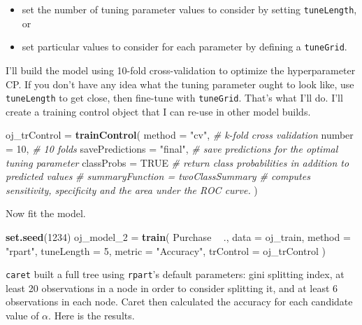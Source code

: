 \documentclass[]{book}
\newenvironment{Shaded}{\begin{snugshade}}{\end{snugshade}}
\newcommand{\CommentTok}[1]{\textcolor[rgb]{0.56,0.35,0.01}{\textit{#1}}}
\newcommand{\DataTypeTok}[1]{\textcolor[rgb]{0.13,0.29,0.53}{#1}}
\newcommand{\DecValTok}[1]{\textcolor[rgb]{0.00,0.00,0.81}{#1}}
\newcommand{\KeywordTok}[1]{\textcolor[rgb]{0.13,0.29,0.53}{\textbf{#1}}}
\newcommand{\NormalTok}[1]{#1}
\newcommand{\OperatorTok}[1]{\textcolor[rgb]{0.81,0.36,0.00}{\textbf{#1}}}
\newcommand{\OtherTok}[1]{\textcolor[rgb]{0.56,0.35,0.01}{#1}}
\newcommand{\StringTok}[1]{\textcolor[rgb]{0.31,0.60,0.02}{#1}}
\providecommand{\tightlist}{%
  \setlength{\itemsep}{0pt}\setlength{\parskip}{0pt}}
\begin{document}
\begin{itemize}
\tightlist
\item
  set the number of tuning parameter values to consider by setting \texttt{tuneLength}, or
\item
  set particular values to consider for each parameter by defining a \texttt{tuneGrid}.
\end{itemize}

I'll build the model using 10-fold cross-validation to optimize the hyperparameter CP. If you don't have any idea what the tuning parameter ought to look like, use \texttt{tuneLength} to get close, then fine-tune with \texttt{tuneGrid}. That's what I'll do. I'll create a training control object that I can re-use in other model builds.

\begin{Shaded}
\begin{Highlighting}[]
\NormalTok{oj_trControl =}\StringTok{ }\KeywordTok{trainControl}\NormalTok{(}
   \DataTypeTok{method =} \StringTok{"cv"}\NormalTok{,  }\CommentTok{# k-fold cross validation}
   \DataTypeTok{number =} \DecValTok{10}\NormalTok{,  }\CommentTok{# 10 folds}
   \DataTypeTok{savePredictions =} \StringTok{"final"}\NormalTok{,       }\CommentTok{# save predictions for the optimal tuning parameter}
   \DataTypeTok{classProbs =} \OtherTok{TRUE}  \CommentTok{# return class probabilities in addition to predicted values}
\CommentTok{#   summaryFunction = twoClassSummary  # computes sensitivity, specificity and the area under the ROC curve.}
\NormalTok{   )}
\end{Highlighting}
\end{Shaded}

Now fit the model.

\begin{Shaded}
\begin{Highlighting}[]
\KeywordTok{set.seed}\NormalTok{(}\DecValTok{1234}\NormalTok{)}
\NormalTok{oj_model_}\DecValTok{2}\NormalTok{ =}\StringTok{ }\KeywordTok{train}\NormalTok{(}
\NormalTok{   Purchase }\OperatorTok{~}\StringTok{ }\NormalTok{., }
   \DataTypeTok{data =}\NormalTok{ oj_train, }
   \DataTypeTok{method =} \StringTok{"rpart"}\NormalTok{,}
   \DataTypeTok{tuneLength =} \DecValTok{5}\NormalTok{,}
   \DataTypeTok{metric =} \StringTok{"Accuracy"}\NormalTok{,}
   \DataTypeTok{trControl =}\NormalTok{ oj_trControl}
\NormalTok{   )}
\end{Highlighting}
\end{Shaded}

\texttt{caret} built a full tree using \texttt{rpart}'s default parameters: gini splitting index, at least 20 observations in a node in order to consider splitting it, and at least 6 observations in each node. Caret then calculated the accuracy for each candidate value of \(\alpha\). Here is the results.
\end{document}
